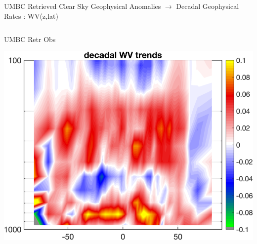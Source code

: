 \documentclass[10pt,t]{beamer}
\begin{document}
\begin{frame}{UMBC Retrieved Clear Sky Geophysical Anomalies $\rightarrow$ Decadal Geophysical Rates : WV(z,lat)}
\begin{columns}
\begin{column}{0.45\columnwidth}
\begin{block}{\footnotesize UMBC Retr Obs}
\vspace{-0.1in}
\begin{center}
\includegraphics[width=0.95\linewidth]{Figs/ClearAnom/umbc_clr_retr_obs_ptemp_rate_200209_201808.png}
\end{center}
\end{block}
\end{column}


\end{columns}
\end{frame}
\end{document}
